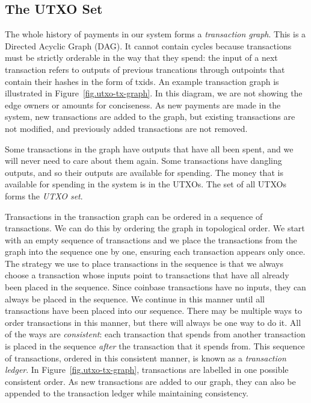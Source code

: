 \subsection*{The UTXO Set}

The whole history of payments in our system forms a \emph{transaction graph}.
This is a Directed Acyclic Graph (DAG). It cannot contain cycles because transactions must be
strictly orderable in the way that they spend: the input of a next transaction refers to
outputs of previous trancations through outpoints that contain their hashes in the form of txids.
An example transaction graph is illustrated in Figure~\ref{fig.utxo-tx-graph}. In this diagram,
we are not showing the edge owners or amounts for conciseness. As new payments are made in the system,
new transactions are added to the graph, but existing transactions are not modified, and previously
added transactions are not removed.

Some transactions in the graph have outputs that have all been spent, and we will never need to care
about them again. Some transactions have dangling outputs, and so their outputs are available for
spending. The money that is available for spending in the system is in the UTXOs. The set of all UTXOs
forms the \emph{UTXO set}.

Transactions in the transaction graph can be ordered in a sequence of transactions. We can do this
by ordering the graph in topological order. We start with an empty sequence of transactions and we
place the transactions from the graph into the sequence one by one, ensuring each transaction appears
only once. The strategy we use to place transactions in the sequence is that we always choose a transaction
whose inputs point to transactions that have all already
been placed in the sequence. Since coinbase transactions have no inputs, they can always be placed in the sequence.
We continue
in this manner until all transactions have been placed into our sequence. There may be multiple
ways to order transactions in this manner, but there will always be one way to do it. All of the ways
are \emph{consistent}: each transaction
that spends from another transaction is placed in the sequence \emph{after} the transaction that it spends
from. This sequence of transactions, ordered in this consistent manner, is known as a
\emph{transaction ledger}. In Figure~\ref{fig.utxo-tx-graph}, transactions are labelled
in one possible consistent order. As new transactions are added to our graph, they can also be appended
to the transaction ledger while maintaining consistency.

